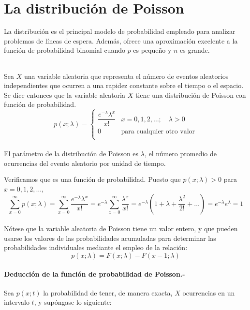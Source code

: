 \section{La distribución de Poisson}
La distribución es el principal modelo de probabilidad empleado para analizar problemas de líneas de espera. Además, ofrece una aproximación excelente a la función de probabilidad binomial cuando $p$ es pequeño y $n$ es grande.\\\\

\begin{tcolorbox}
    \begin{def.}
	Sea $X$ una variable aleatoria que representa el número de eventos aleatorios independientes que ocurren a una rapidez constante sobre el tiempo o el espacio. Se dice entonces que la variable aleatoria $X$ tiene una distribución de Poisson con función de probabilidad.
	$$p(x;\lambda)=\left\{\begin{array}{ll}
		\dfrac{e^{-\lambda}\lambda^x}{x!} & x=0,1,2,\ldots; \quad \lambda > 0\\
		0&\mbox{para cualquier otro valor}\\
	\end{array}\right.$$\\
	El parámetro de la distribución de Poisson es $\lambda$, el número promedio de ocurrencias del evento aleatorio por unidad de tiempo.
    \end{def.}
\end{tcolorbox}
Verificamos que es una función de probabilidad. Puesto que $p(x;\lambda)>0$ para $x=0,1,2,\ldots$,
$$\sum_{x=0}^\infty p(x;\lambda) = \sum_{x=0}^\infty \dfrac{e^{-\lambda}\lambda^x}{x!} = e^{-\lambda}\sum_{x=0}^\infty \dfrac{\lambda^x}{x!}=e^{-\lambda}\left(1+\lambda + \dfrac{\lambda^2}{2!}+\ldots\right) = e^{-\lambda}e^{\lambda}=1$$\\

Nótese que la variable aleatoria de Poisson tiene un valor entero, y que pueden usarse los valores de las probabilidades acumuladas para determinar las probabilidades individuales mediante el empleo de la relación:
$$p(x;\lambda) = F(x;\lambda)-F(x-1;\lambda)$$\\

\textbf{Deducción de la función de probabilidad de Poisson.-}\\\\

Sea $p(x;t)$ la probabilidad de tener, de manera exacta, $X$ ocurrencias en un intervalo $t$, y supóngase lo siguiente:

